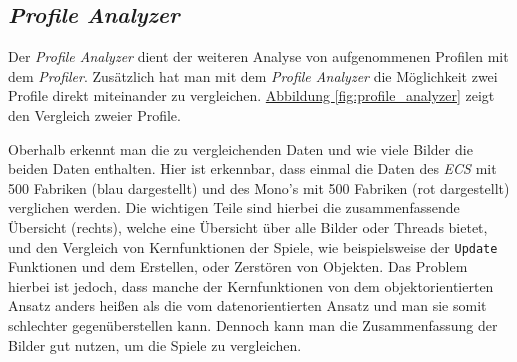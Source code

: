 \subsection{\textit{Profile Analyzer}}
Der \textit{Profile Analyzer} dient der weiteren Analyse von aufgenommenen Profilen mit dem \textit{Profiler}. Zusätzlich hat man mit dem \textit{Profile Analyzer} die Möglichkeit zwei Profile direkt miteinander zu vergleichen. \hyperref[fig:profile_analyzer]{Abbildung \ref*{fig:profile_analyzer}} zeigt den Vergleich zweier Profile.

Oberhalb erkennt man die zu vergleichenden Daten und wie viele Bilder die beiden Daten enthalten. Hier ist erkennbar, dass einmal die Daten des \textit{ECS} mit 500 Fabriken (blau dargestellt) und des Mono's mit 500 Fabriken (rot dargestellt) verglichen werden. Die wichtigen Teile sind hierbei die zusammenfassende Übersicht (rechts), welche eine Übersicht über alle Bilder oder Threads bietet, und den Vergleich von Kernfunktionen der Spiele, wie beispielsweise der \texttt{Update} Funktionen und dem Erstellen, oder Zerstören von Objekten. Das Problem hierbei ist jedoch, dass manche der Kernfunktionen von dem objektorientierten Ansatz anders heißen als die vom datenorientierten Ansatz und man sie somit schlechter gegenüberstellen kann. Dennoch kann man die Zusammenfassung der Bilder gut nutzen, um die Spiele zu vergleichen.
\newpage
